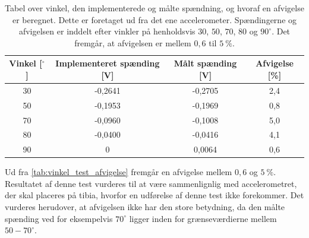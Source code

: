 \begin{table}[H]
\centering
\begin{tabular}{|c|c|c|c|}
\hline
\textbf{Vinkel {[}{$^{\circ}$}{]}} & \textbf{Implementeret spænding {[}V{]}} & \textbf{Målt spænding {[}V{]}} & \textbf{Afvigelse {[}\%{]}} \\ \hline
\multicolumn{1}{|c|}{30}                            & \multicolumn{1}{c|}{-0,2641}                                 & \multicolumn{1}{c|}{-0,2705}                        & \multicolumn{1}{c|}{2,4}                         \\ \hline
\multicolumn{1}{|c|}{50}                            & \multicolumn{1}{c|}{-0,1953}                                 & \multicolumn{1}{c|}{-0,1969}                        & \multicolumn{1}{c|}{0,8}                         \\ \hline
\multicolumn{1}{|c|}{70}                            & \multicolumn{1}{c|}{-0,0960}                                 & \multicolumn{1}{c|}{-0,1008}                        & \multicolumn{1}{c|}{5,0}                         \\ \hline
\multicolumn{1}{|c|}{80}                            & \multicolumn{1}{c|}{-0,0400}                                 & \multicolumn{1}{c|}{-0,0416}                        & \multicolumn{1}{c|}{4,1}                         \\ \hline
\multicolumn{1}{|c|}{90}                            & \multicolumn{1}{c|}{0}                                       & \multicolumn{1}{c|}{0,0064}                         & \multicolumn{1}{c|}{0,6}                         \\ \hline
\end{tabular}
\caption{Tabel over vinkel, den implementerede og målte spændning, og hvoraf en afvigelse er beregnet. Dette er foretaget ud fra det ene accelerometer. Spændingerne og afvigelsen er inddelt efter vinkler på henholdsvis $30$, $50$, $70$, $80$ og $90^{\circ}$. Det fremgår, at afvigelsen er mellem $0,6$ til $5~\%$.}
\label{tab:vinkel_test_afvigelse}
\end{table}

\noindent
Ud fra \autoref{tab:vinkel_test_afvigelse} fremgår en afvigelse mellem $0,6$ og $5~\%$. Resultatet af denne test vurderes til at være sammenlignlig med accelerometret, der skal placeres på tibia, hvorfor en udførelse af denne test ikke forekommer.
Det vurderes herudover, at afvigelsen ikke har den store betydning, da den målte spænding ved for eksempelvis $70^{\circ}$ ligger inden for grænseværdierne mellem $50-70^{\circ}$. 


